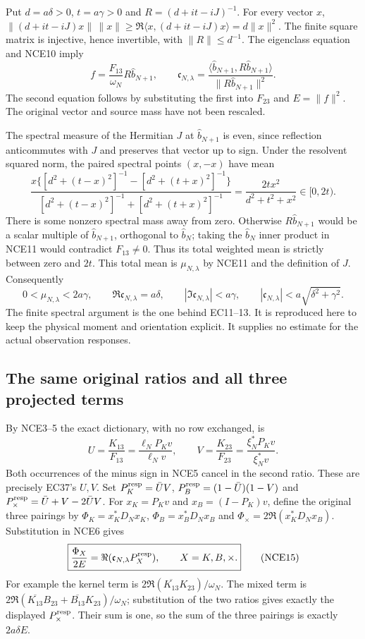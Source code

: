 \documentclass[11pt,a4paper]{article}
\begin{document}
Put $d=a\delta>0$, $t=a\gamma>0$ and
$R=(d+it-iJ)^{-1}$. For every vector $x$,
$\|(d+it-iJ)x\|\,\|x\|\ge
\Re\langle x,(d+it-iJ)x\rangle=d\|x\|^2$.
The finite square matrix is injective, hence invertible, with
$\|R\|\le d^{-1}$.
The eigenclass equation and NCE10 imply
\[
 f=\frac{F_{13}}{\omega_N}R\widehat b_{N+1},\qquad
 \mathfrak c_{N,\lambda}
  =\frac{\langle\widehat b_{N+1},R\widehat b_{N+1}\rangle}
         {\|R\widehat b_{N+1}\|^2}.
 \tag{NCE11}
\]
The second equation follows by substituting the first into
$F_{23}$ and $E=\|f\|^2$. The original vector and source mass
have not been rescaled.

The spectral measure of the Hermitian $J$ at
$\widehat b_{N+1}$ is even, since reflection anticommutes with
$J$ and preserves that vector up to sign. Under the resolvent
squared norm, the paired spectral points $(x,-x)$ have mean
\[
 \frac{x\{[d^2+(t-x)^2]^{-1}-[d^2+(t+x)^2]^{-1}\}}
 {[d^2+(t-x)^2]^{-1}+[d^2+(t+x)^2]^{-1}}
       =\frac{2tx^2}{d^2+t^2+x^2}\in[0,2t).
 \tag{NCE12}
\]
There is some nonzero spectral mass away from zero. Otherwise
$R\widehat b_{N+1}$ would be a scalar multiple of
$\widehat b_{N+1}$, orthogonal to $\widehat b_N$; taking the
$\widehat b_N$ inner product in NCE11 would contradict
$F_{13}\ne0$.
Thus its total weighted mean is strictly between zero and $2t$.
This total mean is $\mu_{N,\lambda}$ by NCE11 and the definition
of $J$. Consequently
\[
 0<\mu_{N,\lambda}<2a\gamma,\qquad
 \Re\mathfrak c_{N,\lambda}=a\delta,\qquad
 |\Im\mathfrak c_{N,\lambda}|<a\gamma,\qquad
 |\mathfrak c_{N,\lambda}|<a\sqrt{\delta^2+\gamma^2}.
 \tag{NCE13}
\]
The finite spectral argument is the one behind EC11--13. It is
reproduced here to keep the physical moment and orientation explicit.
It supplies no estimate for the actual observation responses.

\subsection{The same original ratios and all three projected terms}

By NCE3--5 the exact dictionary, with no row exchanged, is
\[
 \boxed{\quad
 U=\frac{K_{13}}{F_{13}}
     =\frac{\ell_NP_Kv}{\ell_Nv},\qquad
 V=\frac{K_{23}}{F_{23}}
     =\frac{\xi_N^*P_Kv}{\xi_N^*v}.
 \quad}                                                         \tag{NCE14}
\]
Both occurrences of the minus sign in NCE5 cancel in the second
ratio. These are precisely EC37's $U,V$.
Set
$P_K^{\rm resp}=\bar UV$,
$P_B^{\rm resp}=(1-\bar U)(1-V)$ and
$P_\times^{\rm resp}=\bar U+V-2\bar UV$.
For $x_K=P_Kv$ and $x_B=(I-P_K)v$, define the original three
pairings by
$\Phi_K=x_K^*D_Nx_K$,
$\Phi_B=x_B^*D_Nx_B$ and
$\Phi_\times=2\Re(x_K^*D_Nx_B)$.
Substitution in NCE6 gives
\[
 \boxed{\frac{\Phi_X}{2E}
       =\Re(\mathfrak c_{N,\lambda}P_X^{\rm resp}),
           \qquad X=K,B,\times.}
 \tag{NCE15}
\]
For example the kernel term is
$2\Re(\overline{K_{13}}K_{23})/\omega_N$.
The mixed term is
$2\Re(\overline{K_{13}}B_{23}+\overline{B_{13}}K_{23})/\omega_N$;
substitution of the two ratios gives exactly the displayed
$P_\times^{\rm resp}$. Their sum is one, so the sum of the three
pairings is exactly $2a\delta E$.
\end{document}
